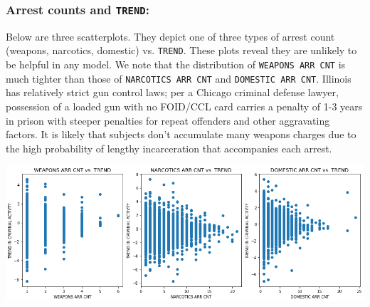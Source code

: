 \subsubsection{Arrest counts and \texttt{TREND}:}
Below are three scatterplots. They depict one of three types of arrest count (weapons, narcotics, domestic) vs. \texttt{TREND}. These plots reveal they are unlikely to be helpful in any model. We note that the distribution of \texttt{WEAPONS ARR CNT} is much tighter than those of \texttt{NARCOTICS ARR CNT} and \texttt{DOMESTIC ARR CNT}. Illinois has relatively strict gun control laws; per a Chicago criminal defense lawyer, possession of a loaded gun with no FOID/CCL card carries a penalty of 1-3 years in prison with steeper penalties for repeat offenders and other aggravating factors.\cite{lawyer} It is likely that subjects don't accumulate many weapons charges due to the high probability of lengthy incarceration that accompanies each arrest.
\begin{center}
    \includegraphics[scale=.4]{images/arrest_counts.png}
\end{center}
